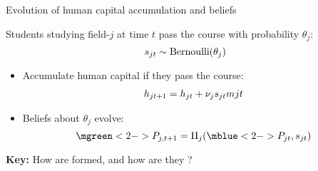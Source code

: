 \begin{frame}{Evolution of human capital accumulation and beliefs}


Students studying field-$j$ at time $t$ pass the course with probability $\theta_j$:
\begin{equation*}
    s_{jt} \sim \text{Bernoulli} (\theta_j)
\end{equation*}
\vspace{-2.5ex}
\begin{itemize}
  \item 
  Accumulate human capital if they pass the course:
  \begin{align*}
    h_{jt+1} = h_{jt} + \nu_{j} s_{jt} m{jt}
  \end{align*}
  \item 
  Beliefs about $\theta_j$ evolve:
  \begin{equation*}
      \mgreen<2->{P_{j,t+1}} = \Pi_j (\mblue<2->{P_{jt}}, \pass_{jt})
  \end{equation*}
\end{itemize}

\pause
\vspace{5ex}
\textbf{Key:} How are   formed, and how are they ? 


\end{frame}

